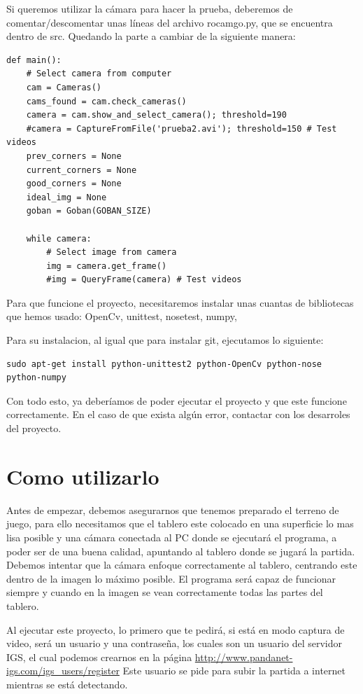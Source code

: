 \documentclass[12pt,a4paper]{report}
\begin{document}
Si queremos utilizar la cámara para hacer la prueba, deberemos de
comentar/descomentar unas líneas del archivo rocamgo.py, que se encuentra dentro
de src. Quedando la parte a cambiar de la siguiente manera: 

\begin{verbatim}
def main():
    # Select camera from computer
    cam = Cameras()
    cams_found = cam.check_cameras()
    camera = cam.show_and_select_camera(); threshold=190
    #camera = CaptureFromFile('prueba2.avi'); threshold=150 # Test videos
    prev_corners = None
    current_corners = None
    good_corners = None
    ideal_img = None
    goban = Goban(GOBAN_SIZE)

    while camera: 
        # Select image from camera 
        img = camera.get_frame()
        #img = QueryFrame(camera) # Test videos
\end{verbatim}

Para que funcione el proyecto, necesitaremos instalar unas cuantas de bibliotecas
que hemos usado: OpenCv, unittest, nosetest, numpy, 

Para su instalacion, al igual que para instalar git, ejecutamos lo siguiente:

\begin{verbatim}
sudo apt-get install python-unittest2 python-OpenCv python-nose python-numpy
\end{verbatim}

Con todo esto, ya deberíamos de poder ejecutar el proyecto y que este funcione
correctamente. En el caso de que exista algún error, contactar con los
desarroles del proyecto. 


\section{Como utilizarlo}

Antes de empezar, debemos asegurarnos que tenemos preparado el terreno de juego,
para ello necesitamos que el tablero este colocado en una superficie lo mas lisa
posible y una cámara conectada al PC donde se ejecutará el programa, a poder
ser de una buena calidad, apuntando al tablero donde se jugará la partida.
Debemos intentar que la cámara enfoque correctamente al tablero, centrando este
dentro de la imagen lo máximo posible. El programa será capaz de funcionar
siempre y cuando en la imagen se vean correctamente todas las partes del
tablero.

Al ejecutar este proyecto, lo primero que te pedirá, si está en modo captura de
video, será un usuario y una contraseña, los cuales son un usuario del servidor
IGS, el cual podemos crearnos en la página 
\url{http://www.pandanet-igs.com/igs_users/register}
Este usuario se pide para subir la partida a internet mientras se está
detectando. 
\end{document}
